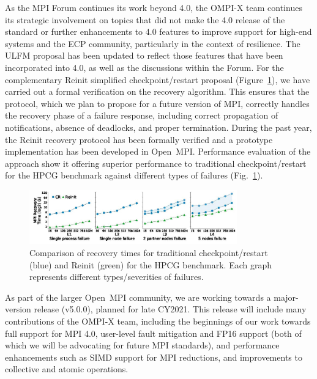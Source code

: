 As the MPI Forum continues its work beyond 4.0, the OMPI-X team continues 
its strategic involvement on topics that did not make the 4.0 release of the standard or further enhancements to 4.0 features
to improve support for high-end systems and the ECP community,  particularly in the context of resilience. The ULFM
proposal has been updated to reflect those features that have been incorporated into 4.0, as well as the discussions
within the Forum.  For the complementary Reinit simplified checkpoint/restart proposal (Figure~\ref{fig:reinit}), we have carried out a formal verification on the recovery algorithm. 
This ensures that the protocol, which we plan to propose for a future version of MPI, correctly handles the recovery phase 
of a failure response, including correct propagation of notifications, absence of deadlocks, and proper termination.
During the past year, the Reinit recovery protocol has been formally verified
and a prototype implementation has been developed in Open~MPI.  Performance evaluation
of the approach show it offering superior performance to traditional checkpoint/restart
for the HPCG benchmark against different types of failures (Fig.~\ref{fig:reinit}).

\begin{figure}
    \centering
\includegraphics[width=0.80\textwidth]{projects/2.3.1-PMR/2.3.1.17-OMPI-X/reinit-performance.jpg}
\caption{Comparison of recovery times for traditional checkpoint/restart (blue) and Reinit (green) for the HPCG benchmark.  
Each graph represents different types/severities of failures.}
\label{fig:reinit}
\end{figure}

As part of the larger Open~MPI community, we are working towards a major-version
release (v5.0.0), planned for late CY2021.  This release will include many contributions
of the OMPI-X team, including the beginnings of our work towards full support for
MPI 4.0, user-level fault mitigation and FP16 support (both of which we will be advocating
for future MPI standards), and performance enhancements such as SIMD support for MPI reductions,
and improvements to collective and atomic operations.


